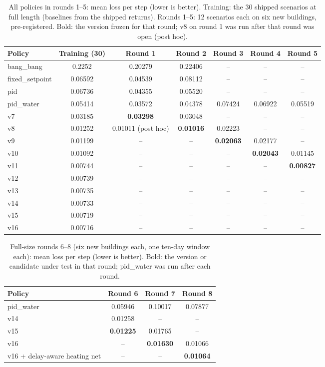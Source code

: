 \documentclass{article}
\begin{document}
\begin{table}[!htb]\centering
\caption{All policies in rounds 1--5: mean loss per step (lower is better). Training: the 30 shipped scenarios at full length (baselines from the shipped returns). Rounds 1--5: 12 scenarios each on six new buildings, pre-registered. Bold: the version frozen for that round; v8 on round 1 was run after that round was open (post hoc).}\label{tab:grid}
\small
\begin{tabular}{lcccccc}\toprule
Policy & Training (30) & Round 1 & Round 2 & Round 3 & Round 4 & Round 5\\\midrule
bang\_bang & 0.2252 & 0.20279 & 0.22406 & -- & -- & --\\
fixed\_setpoint & 0.06592 & 0.04539 & 0.08112 & -- & -- & --\\
pid & 0.06736 & 0.04355 & 0.05520 & -- & -- & --\\
pid\_water & 0.05414 & 0.03572 & 0.04378 & 0.07424 & 0.06922 & 0.05519\\
v7 & 0.03185 & \textbf{0.03298} & 0.03048 & -- & -- & --\\
v8 & 0.01252 & 0.01011 (post hoc) & \textbf{0.01016} & 0.02223 & -- & --\\
v9 & 0.01199 & -- & -- & \textbf{0.02063} & 0.02177 & --\\
v10 & 0.01092 & -- & -- & -- & \textbf{0.02043} & 0.01145\\
v11 & 0.00744 & -- & -- & -- & -- & \textbf{0.00827}\\
v12 & 0.00739 & -- & -- & -- & -- & --\\
v13 & 0.00735 & -- & -- & -- & -- & --\\
v14 & 0.00733 & -- & -- & -- & -- & --\\
v15 & 0.00719 & -- & -- & -- & -- & --\\
v16 & 0.00716 & -- & -- & -- & -- & --\\\bottomrule
\end{tabular}
\end{table}
\begin{table}[!htb]\centering
\caption{Full-size rounds 6--8 (six new buildings each, one ten-day window each): mean loss per step (lower is better). Bold: the version or candidate under test in that round; pid\_water was run after each round.}\label{tab:grid68}
\small
\begin{tabular}{lccc}\toprule
Policy & Round 6 & Round 7 & Round 8\\\midrule
pid\_water & 0.05946 & 0.10017 & 0.07877\\
v14 & 0.01258 & -- & --\\
v15 & \textbf{0.01225} & 0.01765 & --\\
v16 & -- & \textbf{0.01630} & 0.01066\\
v16 + delay-aware heating net & -- & -- & \textbf{0.01064}\\\bottomrule
\end{tabular}
\end{table}
\end{document}

